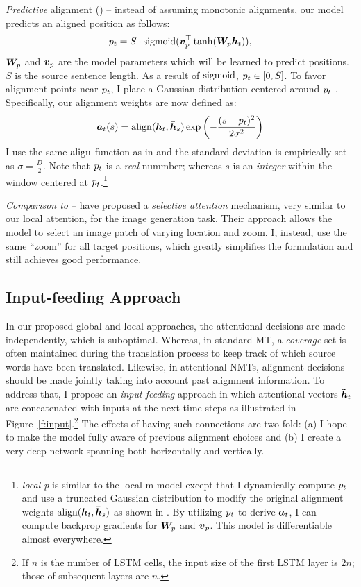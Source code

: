 \textit{Predictive} alignment ({\bf \localp{}}) --  %
instead of assuming monotonic alignments, our model predicts an aligned position as follows:
\begin{equation}
p_{t} = S \cdot \operatorname{sigmoid}(\mbox{\boldmath{$v$}}_p^\top\tanh(\bm{W}_{p}\mbox{\boldmath{$h$}}_{t})),
\label{e:p}
\end{equation}
$\bm{W}_{p}$ and $\mbox{\boldmath{$v$}}_p$ are the model parameters which will be learned
to predict positions. $S$ is the source sentence length. As a result of $\operatorname{sigmoid}$, $p_{t}
\in [0, S]$. To favor alignment points near $p_{t}$, I place a Gaussian distribution centered around $p_{t}$ . Specifically, our alignment weights are now
defined as:
\begin{equation}
\mbox{\boldmath{$a$}}_{t}(s) = \operatorname{align}(\mbox{\boldmath{$h$}}_{t}, \mbox{\boldmath{$\bar{h}$}}_{s}) \exp \left(-\frac{(s-p_{t})^2}{2\sigma^2}\right) 
\label{e:align_p}
\end{equation}
I use the same $\operatorname{align}$ function as in
 and the standard deviation is empirically set as
$\sigma\!=\!\frac{D}{2}$. Note that $p_{t}$ is a {\it real} nummber; whereas $s$
is an {\it integer} within the window centered at $p_{t}$.\footnote{{\it local-p} is similar to the
local-m model except that I dynamically
compute $p_{t}$ and use a truncated Gaussian distribution to modify the original alignment
weights $\operatorname{align}(\mbox{\boldmath{$h$}}_{t}, \mbox{\boldmath{$\bar{h}$}}_{s})$ as shown in . By utilizing $p_{t}$
to derive $\mbox{\boldmath{$a$}}_{t}$, I can compute backprop gradients for $\bm{W}_{p}$ and $\mbox{\boldmath{$v$}}_p$.
This model is differentiable almost everywhere.} 

\textit{Comparison to \cite{draw15}} --
have proposed a {\it selective attention} mechanism, very
similar to our local attention, for the image generation task. Their approach 
allows the model to select an image patch of varying location and zoom. I,
instead, use the same ``zoom'' for all target positions, which greatly
simplifies the formulation and still achieves good
performance.

\subsection{Input-feeding Approach}
\label{subsec:input}
In our proposed global and local approaches, the attentional decisions are made
independently, which is suboptimal. Whereas, in standard MT, a {\it coverage}
set is often maintained during the translation process to keep track of which
source words have been translated. Likewise, in attentional NMTs, alignment
decisions should be made jointly taking into account past alignment information.
To address that, I propose an {\it input-feeding} approach in which attentional
vectors $\mbox{\boldmath{$\tilde{h}$}}_{t}$ are concatenated with inputs at the next time steps as illustrated in
Figure~\ref{f:input}.\footnote{If $n$ is the number of LSTM cells, the
input size of the first LSTM layer is $2n$; those of subsequent
layers are $n$.} The effects of having such connections are two-fold:
(a) I hope to make the model fully aware of previous alignment choices and (b)
I create a very deep network spanning both horizontally and vertically.

